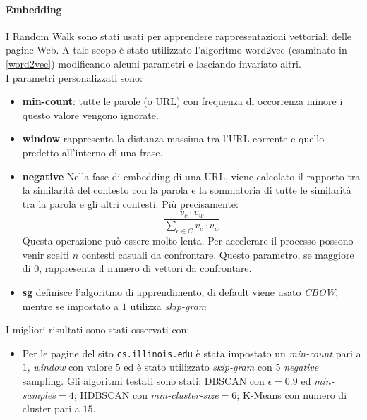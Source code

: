 \paragraph{Embedding}I Random Walk sono stati usati per apprendere rappresentazioni vettoriali delle pagine Web. A tale scopo è stato utilizzato l'algoritmo word2vec \cite{gensim} (esaminato in \ref{word2vec}) modificando alcuni parametri e lasciando invariato altri.
\\
I parametri personalizzati sono:
\begin{itemize}
\item \textbf{min-count}: tutte le parole (o URL) con frequenza di occorrenza minore i questo valore vengono ignorate.
\item \textbf{window} rappresenta la distanza massima tra l'URL corrente e quello predetto all'interno di una frase.
\item \textbf{negative} Nella fase di embedding di una URL, viene calcolato il rapporto tra la similarità del contesto con la parola e la sommatoria di tutte le similarità tra la parola e gli altri contesti. Più precisamente:
\begin{equation}
\frac{v_c \cdot v_w}{\sum\limits_{c \in C} v_c \cdot v_w}
\end{equation}
Questa operazione può essere molto lenta. Per accelerare il processo possono venir scelti $n$ contesti casuali da confrontare. Questo parametro, se maggiore di $0$, rappresenta il numero di vettori da confrontare.
\item \textbf{sg} definisce l'algoritmo di apprendimento, di default viene usato \textit{CBOW}, mentre se impostato a $1$ utilizza \textit{skip-gram} \cite{Mikolov13}
\end{itemize}
I migliori risultati sono stati osservati con:
\begin{itemize}
\item Per le pagine del sito \texttt{cs.illinois.edu} è stata impostato un \textit{min-count} pari a $1$, \textit{window} con valore $5$ ed è stato utilizzato \textit{skip-gram} con $5$ \textit{negative} sampling. Gli algoritmi testati sono stati: DBSCAN con $\epsilon = 0.9$ ed \textit{min-samples}$ = 4$; HDBSCAN con \textit{min-cluster-size}$=6$; K-Means con numero di cluster pari a $15$. 
\end{itemize}

